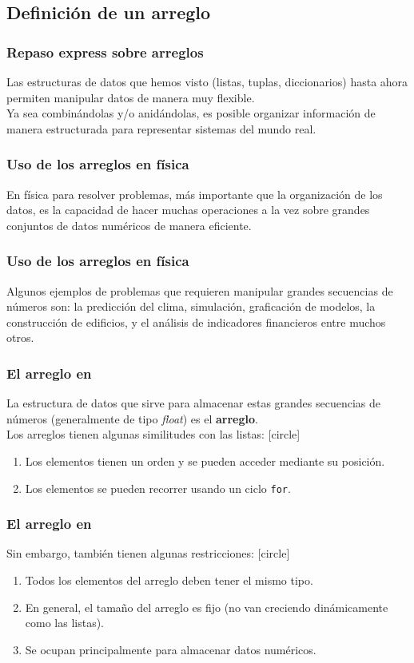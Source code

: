\subsection{Definición de un arreglo}
\begin{frame}
\frametitle{Repaso express sobre arreglos}
Las estructuras de datos que hemos visto (listas, tuplas, diccionarios) hasta ahora permiten manipular datos de manera muy flexible.
\\
\bigskip
Ya sea combinándolas y/o anidándolas, es posible organizar información de manera estructurada para representar sistemas del mundo real.
\end{frame}
\begin{frame}
\frametitle{Uso de los arreglos en física}  
En física para resolver problemas, más importante que la organización de los datos, es la capacidad de hacer muchas operaciones a la vez sobre grandes conjuntos de datos numéricos de manera eficiente.
\end{frame}
\begin{frame}
\frametitle{Uso de los arreglos en física}
Algunos ejemplos de problemas que requieren manipular grandes secuencias de números son: la predicción del clima, simulación, graficación de modelos, la construcción de edificios, y el análisis de indicadores financieros entre muchos otros.
\end{frame}
\begin{frame}
\frametitle{El arreglo en \python}
La estructura de datos que sirve para almacenar estas grandes secuencias de números (generalmente de tipo \emph{float}) es el \textbf{arreglo}.
\\
\bigskip
Los arreglos tienen algunas similitudes con las listas:
[circle]
\begin{enumerate}[<+->]
\item Los elementos tienen un orden y se pueden acceder mediante su posición.
\item Los elementos se pueden recorrer usando un ciclo \texttt{for}.
\end{enumerate}
\end{frame}
\begin{frame}
\frametitle{El arreglo en \python}
Sin embargo, también tienen algunas restricciones:
[circle]
\begin{enumerate}[<+->]
\item Todos los elementos del arreglo deben tener el mismo tipo.
\item En general, el tamaño del arreglo es fijo (no van creciendo dinámicamente como las listas).
\item Se ocupan principalmente para almacenar datos numéricos.
\end{enumerate}
\end{frame}
